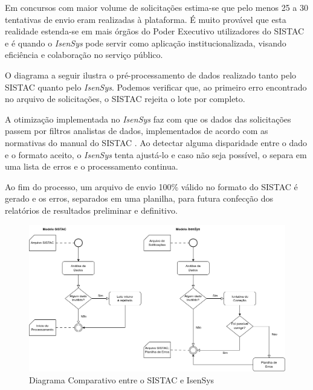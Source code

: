 \documentclass[
	12pt,			%
	openright,		%
	oneside,	
	a4paper,		%
	english,		%
	brazil			%
]{abntex2/abntex2}  %
\begin{document}
		Em concursos com maior volume de solicitações estima-se que pelo menos 25 a 30 tentativas de envio eram realizadas à plataforma. É muito provável que esta realidade estenda-se em mais órgãos do Poder Executivo utilizadores do SISTAC e é quando o \textit{IsenSys} pode servir como aplicação institucionalizada, visando eficiência e colaboração no serviço público.
		
		O diagrama a seguir ilustra o pré-processamento de dados realizado tanto pelo SISTAC quanto pelo \textit{IsenSys}. Podemos verificar que, ao primeiro erro encontrado no arquivo de solicitações, o SISTAC rejeita o lote por completo.
		
		A otimização implementada no \textit{IsenSys} faz com que os dados das solicitações passem por filtros analistas de dados, implementados de acordo com as normativas do manual do SISTAC \cite{sistac-formatos}. Ao detectar alguma disparidade entre o dado e o formato aceito, o \textit{IsenSys} tenta ajustá-lo e caso não seja possível, o separa em uma lista de erros e o processamento continua.
		
		Ao fim do processo, um arquivo de envio 100\% válido no formato do SISTAC é gerado e os erros, separados em uma planilha, para futura confecção dos relatórios de resultados preliminar e definitivo.
		
		\begin{figure}[H]
			\begin{center}
				
				\caption{Diagrama Comparativo entre o SISTAC e IsenSys}
				
				\includegraphics[scale=0.5]{img/diagrama-ativs-ganhos}
				
			\end{center}
		\end{figure}
		
\end{document}
